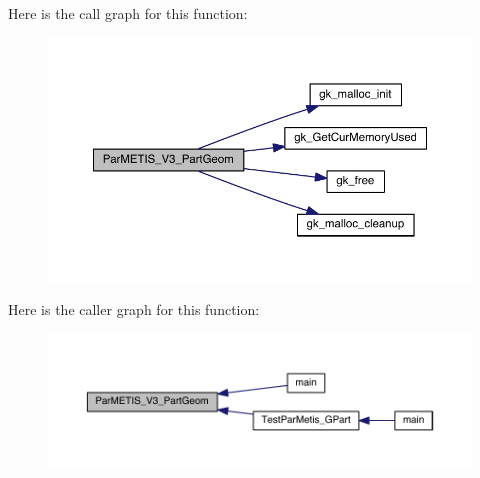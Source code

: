 Here is the call graph for this function\+:\nopagebreak
\begin{figure}[H]
\begin{center}
\leavevmode
\includegraphics[width=350pt]{a00356_a6ba7172d25cc2a5601ec5a64014ec7a2_cgraph}
\end{center}
\end{figure}
Here is the caller graph for this function\+:\nopagebreak
\begin{figure}[H]
\begin{center}
\leavevmode
\includegraphics[width=350pt]{a00356_a6ba7172d25cc2a5601ec5a64014ec7a2_icgraph}
\end{center}
\end{figure}
\mbox{\label{a00356_a46ac099ac07c553c3eb6641f076ce75f}} 
